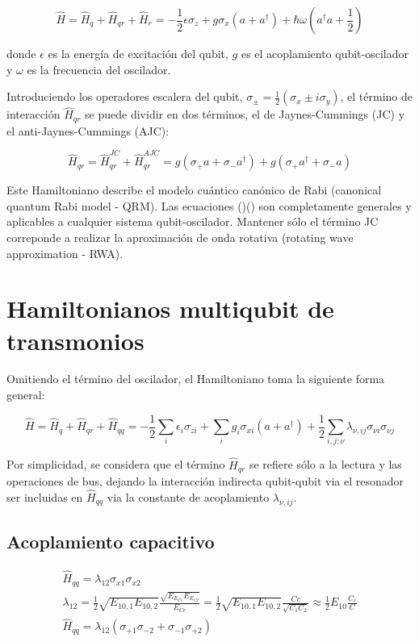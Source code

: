 \documentclass[11pt, spanish]{report}
\begin{document}
\[
\hat{H} = \hat{H}_q + \hat{H}_{qr} + \hat{H}_r = -\frac{1}{2} \epsilon \sigma_z + g \sigma_x (a+a^\dag) + \hbar \omega (a^\dag a + \frac{1}{2})
\]

donde $\epsilon$ es la energía de excitación del qubit, $g$ es el acoplamiento qubit-oscilador y $\omega$ es la frecuencia del oscilador.
\vspace{0.5cm}

Introduciendo los operadores escalera del qubit, $\sigma_\pm = \frac{1}{2}(\sigma_x \pm i \sigma_y)$, el término de interacción $\hat{H}_{qr}$ se puede dividir en dos términos, el de Jaynes-Cummings (JC) y el anti-Jaynes-Cummings (AJC):

\[
\hat{H}_{qr} = \hat{H}_{qr}^{JC} + \hat{H}_{qr}^{AJC} = g(\sigma_+ a + \sigma_- a^\dag) + g(\sigma_+ a^\dag + \sigma_- a)
\]

Este Hamiltoniano describe el modelo cuántico canónico de Rabi (canonical quantum Rabi model - QRM). Las ecuaciones ()() son completamente generales y aplicables a cualquier sistema qubit-oscilador. Mantener sólo el término JC correponde a realizar la aproximación de onda rotativa (rotating wave approximation - RWA).

\section{Hamiltonianos multiqubit de transmonios}
Omitiendo el término del oscilador, el Hamiltoniano toma la siguiente forma general:

\[
\hat{H} = \hat{H}_q + \hat{H}_{qr} + \hat{H}_{qq} = -\frac{1}{2} \sum\limits_i \epsilon_i \sigma_{zi} + \sum\limits_i g_i \sigma_{xi} (a+a^\dag) + \frac{1}{2} \sum\limits_{i,j;\nu} \lambda_{\nu,ij} \sigma_{\nu i} \sigma_{\nu j}
\]

Por simplicidad, se considera que el término $\hat{H}_{qr}$ se refiere sólo a la lectura y las operaciones de bus, dejando la interacción indirecta qubit-qubit via el resonador ser incluidas en $\hat{H}_{qq}$ via la constante de acoplamiento $\lambda_{\nu,ij}$.

\subsection{Acoplamiento capacitivo}
\begin{align*}
\hat{H}_{qq} = \lambda_{1 2} \sigma_{x1} \sigma_{x2} \\
\lambda_{1 2} = \frac{1}{2} \sqrt{E_{1 0, 1} E_{1 0, 2}} \frac{\sqrt{E_{E_{C1}} E_{E_{C2}}}}{E_{Cc}} = \frac{1}{2} \sqrt{E_{1 0, 1} E_{1 0, 2}} \frac{Cc}{\sqrt{C_1 C_2}} \approx \frac{1}{2} E_{1 0} \frac{C_c}{C} \\
\hat{H}_{qq} = \lambda_{1 2} (\sigma_{+1} \sigma_{-2}  + \sigma_{-1} \sigma_{+2})
\end{align*}
\end{document}
